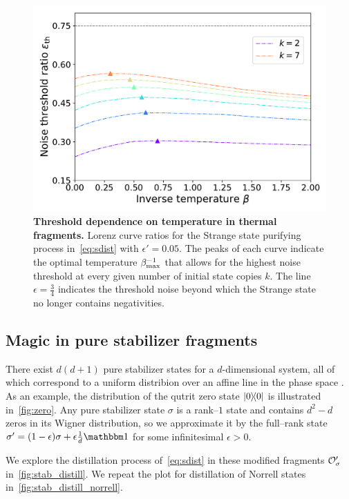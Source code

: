 \documentclass[pra,
aps,
twocolumn,
superscriptaddress,
groupedaddress,
nofootinbib,
reprint
]{revtex4-1}
\begin{document}
\begin{figure}[h]
    \centering
    \includegraphics[scale=0.5]{figs/thermal_distill.pdf}
    \caption{\textbf{Threshold dependence on temperature in thermal fragments.} Lorenz curve ratios for the Strange state purifying process in~\cref{eq:sdist} with $\epsilon' = 0.05$.
    The peaks of each curve indicate the optimal temperature $\beta_{\rm{max}}^{-1}$ that allows for the highest noise threshold at every given number of initial state copies $k$.
    The line $\epsilon = \frac{3}{4}$ indicates the threshold noise beyond which the Strange state no longer contains negativities.
    }
    \label{fig:thermal_distill}
\end{figure}

\subsection{Magic in pure stabilizer fragments}\label{sec:magstab}

There exist $d(d+1)$ pure stabilizer states for a $d$-dimensional system, all of which correspond to a uniform distribion over an affine line in the phase space .
As an example, the distribution of the qutrit zero state $\ketbra{0}$ is illustrated in~\cref{fig:zero}.
Any pure stabilizer state $\sigma$ is a rank--$1$ state and contains $d^2 - d$ zeros in its Wigner distribution, so we approximate it by the full--rank state $\sigma' = (1-\epsilon)\sigma + \epsilon \frac{1}{d}\id$ for some infinitesimal $\epsilon > 0$.

We explore the distillation process of~\cref{eq:sdist} in these modified fragments $\mathcal{O}_\sigma'$ in~\cref{fig:stab_distill}.
We repeat the plot for distillation of Norrell states in~\cref{fig:stab_distill_norrell}.
\end{document}
